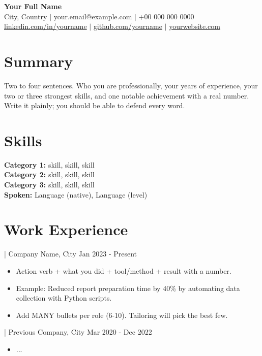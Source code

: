 \documentclass[11pt]{article}
\newcommand{\job}[4]{%
  \vspace{4pt}{\bfseries #1} | #2#3 \hfill #4\par}
\begin{document}
\begin{center}
{\LARGE\bfseries Your Full Name}\\[3pt]
City, Country $\vert$ your.email@example.com $\vert$ +00 000 000 0000\\[1pt]
\href{https://linkedin.com/in/yourname}{linkedin.com/in/yourname} $\vert$
\href{https://github.com/yourname}{github.com/yourname} $\vert$
\href{https://yourwebsite.com}{yourwebsite.com}
\end{center}

\section{Summary}
Two to four sentences. Who you are professionally, your years of experience,
your two or three strongest skills, and one notable achievement with a real
number. Write it plainly; you should be able to defend every word.

\section{Skills}
\textbf{Category 1:} skill, skill, skill\\
\textbf{Category 2:} skill, skill, skill\\
\textbf{Category 3:} skill, skill, skill\\
\textbf{Spoken:} Language (native), Language (level)

\section{Work Experience}

\job{Job Title}{Company Name}{, City}{Jan 2023 - Present}
\begin{itemize}
  \item Action verb + what you did + tool/method + result with a number.
  \item Example: Reduced report preparation time by 40\% by automating data
        collection with Python scripts.
  \item Add MANY bullets per role (6-10). Tailoring will pick the best few.
\end{itemize}

\job{Previous Job Title}{Previous Company}{, City}{Mar 2020 - Dec 2022}
\begin{itemize}
  \item ...
\end{itemize}
\end{document}

